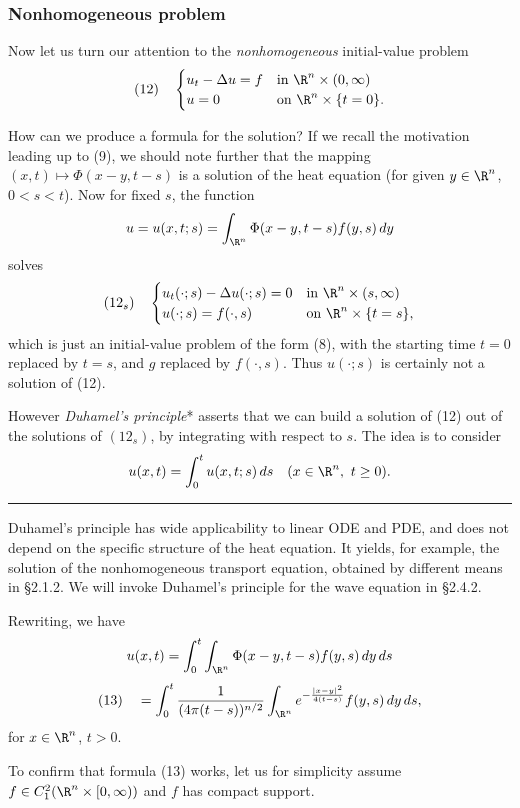 \subsubsection{Nonhomogeneous problem}
\label{sec:heat-nonhomogeneous-problem}

Now let us turn our attention to the \textit{nonhomogeneous} initial-value problem
$$(12) \quad \begin{cases} u_t - \Delta u = f & \text{in } \R^n \times (0,\infty) \\ u = 0 & \text{on } \R^n \times \{t=0\}. \end{cases}$$

How can we produce a formula for the solution? If we recall the motivation leading up to (9), we should note further that the mapping $(x,t) \mapsto \Phi(x-y,t-s)$ is a solution of the heat equation (for given $y \in \R^n$, $0<s<t$). Now for fixed $s$, the function
$$u = u(x,t;s) = \int_{\R^n} \Phi(x-y,t-s)f(y,s)\,dy$$
solves
$$(12_s) \quad \begin{cases} u_t(\cdot;s) - \Delta u(\cdot;s) = 0 & \text{in } \R^n \times (s,\infty) \\ u(\cdot;s) = f(\cdot,s) & \text{on } \R^n \times \{t=s\}, \end{cases}$$
which is just an initial-value problem of the form (8), with the starting time $t=0$ replaced by $t=s$, and $g$ replaced by $f(\cdot,s)$. Thus $u(\cdot;s)$ is certainly not a solution of (12).

However \textit{Duhamel's principle}* asserts that we can build a solution of (12) out of the solutions of $(12_s)$, by integrating with respect to $s$. The idea is to consider
$$u(x,t) = \int_0^t u(x,t;s)\,ds \quad (x \in \R^n,\ t \geq 0).$$

\begin{center}
\rule{2in}{0.4pt}
\end{center}
{\small *Duhamel's principle has wide applicability to linear ODE and PDE, and does not depend on the specific structure of the heat equation. It yields, for example, the solution of the nonhomogeneous transport equation, obtained by different means in \S2.1.2. We will invoke Duhamel's principle for the wave equation in \S2.4.2.}

Rewriting, we have
$$u(x,t) = \int_0^t \int_{\R^n} \Phi(x-y,t-s)f(y,s)\,dy\,ds$$
$$(13) \quad = \int_0^t \frac{1}{(4\pi(t-s))^{n/2}} \int_{\R^n} e^{-\frac{|x-y|^2}{4(t-s)}}f(y,s)\,dy\,ds,$$
for $x \in \R^n$, $t>0$.

To confirm that formula (13) works, let us for simplicity assume $f \in C_1^2(\R^n \times [0,\infty))$ and $f$ has compact support.

